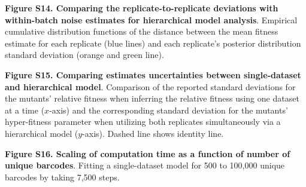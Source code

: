 \documentclass[
]{scrartcl}
\begin{document}
\textbf{Figure S14. Comparing the replicate-to-replicate deviations with
within-batch noise estimates for hierarchical model analysis}. Empirical
cumulative distribution functions of the distance between the mean fitness
estimate for each replicate (blue lines) and each replicate's posterior
distribution standard deviation (orange and green line).

\textbf{Figure S15. Comparing estimates uncertainties between single-dataset and
hierarchical model}. Comparison of the reported standard deviations for the
mutants' relative fitness when inferring the relative fitness using one dataset
at a time (\(x\)-axis) and the corresponding standard deviation for the mutants'
hyper-fitness parameter when utilizing both replicates simultaneously via a
hierarchical model (\(y\)-axis). Dashed line shows identity line.

\textbf{Figure S16. Scaling of computation time as a function of number of
unique barcodes}. Fitting a single-dataset model for 500 to 100,000 unique
barcodes by taking 7,500 steps.

\clearpage


\end{document}
